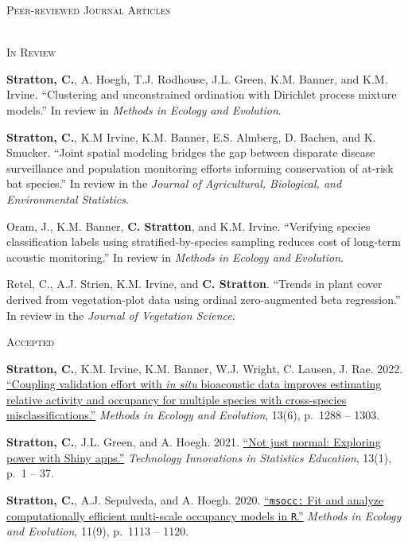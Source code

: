 \documentclass[a4paper]{article}
\newcommand{\lineunder} {
	\vspace*{-8pt} \\
	\hspace*{-18pt} \hrulefill \\
}
\newcommand{\header} [1] {
	{\hspace*{-18pt}\vspace*{6pt} \textsc{#1}}
	\vspace*{-6pt} \lineunder
}
\newcommand{\subheader} [1] {
	{\hspace*{-9pt}\vspace*{6pt} \textsc{#1}}
	\vspace*{-6pt}
}
\begin{document}
\header{Peer-reviewed Journal Articles}
\vspace*{2mm}

\subheader{In Review}
\vspace*{2mm}

\textbf{Stratton, C.}, A. Hoegh, T.J. Rodhouse, J.L. Green, K.M. Banner,
and K.M. Irvine. ``Clustering and unconstrained ordination with
Dirichlet process mixture models.'' In review in
\textit{Methods in Ecology and Evolution}. \vspace*{2mm}

\textbf{Stratton, C.}, K.M Irvine, K.M. Banner, E.S. Almberg, D. Bachen,
and K. Smucker. ``Joint spatial modeling bridges the gap between
disparate disease surveillance and population monitoring efforts
informing conservation of at-risk bat species.'' In review in the
\textit{Journal of Agricultural, Biological, and Environmental Statistics}.
\vspace*{2mm}

Oram, J., K.M. Banner, \textbf{C. Stratton}, and K.M. Irvine.
``Verifying species classification labels using stratified-by-species
sampling reduces cost of long-term acoustic monitoring.'' In review in
\textit{Methods in Ecology and Evolution}. \vspace*{2mm}

Retel, C., A.J. Strien, K.M. Irvine, and \textbf{C. Stratton}. ``Trends
in plant cover derived from vegetation-plot data using ordinal
zero-augmented beta regression.'' In review in the
\textit{Journal of Vegetation Science}. \vspace*{2mm}

\subheader{Accepted}
\vspace*{2mm}

\textbf{Stratton, C.}, K.M. Irvine, K.M. Banner, W.J. Wright, C. Lausen,
J. Rae. 2022. \href{https://doi.org/10.1111/2041-210X.13831}{``Coupling
validation effort with \emph{in situ} bioacoustic data improves
estimating relative activity and occupancy for multiple species with
cross-species misclassifications.''}
\textit{Methods in Ecology and Evolution}, 13(6), p.~1288 -- 1303.
\vspace*{2mm}

\textbf{Stratton, C.}, J.L. Green, and A. Hoegh. 2021.
\href{https://doi.org/10.5070/T513146468}{``Not just normal: Exploring
power with Shiny apps.''}
\textit{Technology Innovations in Statistics Education}, 13(1), p.~1 --
37. \vspace*{2mm}

\textbf{Stratton, C.}, A.J. Sepulveda, and A. Hoegh. 2020.
\href{https://doi.org/10.1111/2041-210X.13442}{``\texttt{msocc:} Fit and
analyze computationally efficient multi-scale occupancy models in
\texttt{R}.''} \textit{Methods in Ecology and Evolution}, 11(9), p.~1113
-- 1120. \vspace*{2mm}
\end{document}
